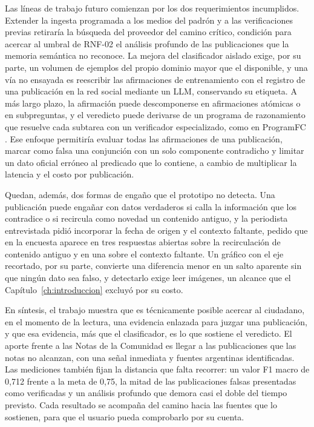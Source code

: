 Las líneas de trabajo futuro comienzan por los dos requerimientos incumplidos. Extender la ingesta programada a los medios del padrón y a las verificaciones previas retiraría la búsqueda del proveedor del camino crítico, condición para acercar al umbral de RNF-02 el análisis profundo de las publicaciones que la memoria semántica no reconoce. La mejora del clasificador aislado exige, por su parte, un volumen de ejemplos del propio dominio mayor que el disponible, y una vía no ensayada es reescribir las afirmaciones de entrenamiento con el registro de una publicación en la red social mediante un LLM, conservando su etiqueta. A más largo plazo, la afirmación puede descomponerse en afirmaciones atómicas o en subpreguntas, y el veredicto puede derivarse de un programa de razonamiento que resuelve cada subtarea con un verificador especializado, como en ProgramFC \parencite{PanEtAl2023}. Ese enfoque permitiría evaluar todas las afirmaciones de una publicación, marcar como falsa una conjunción con un solo componente contradicho y limitar un dato oficial erróneo al predicado que lo contiene, a cambio de multiplicar la latencia y el costo por publicación.

Quedan, además, dos formas de engaño que el prototipo no detecta. Una publicación puede engañar con datos verdaderos si calla la información que los contradice o si recircula como novedad un contenido antiguo, y la periodista entrevistada pidió incorporar la fecha de origen y el contexto faltante, pedido que en la encuesta aparece en tres respuestas abiertas sobre la recirculación de contenido antiguo y en una sobre el contexto faltante. Un gráfico con el eje recortado, por su parte, convierte una diferencia menor en un salto aparente sin que ningún dato sea falso, y detectarlo exige leer imágenes, un alcance que el Capítulo~\ref{ch:introduccion} excluyó por su costo.

En síntesis, el trabajo muestra que es técnicamente posible acercar al ciudadano, en el momento de la lectura, una evidencia enlazada para juzgar una publicación, y que esa evidencia, más que el clasificador, es lo que sostiene el veredicto. El aporte frente a las Notas de la Comunidad es llegar a las publicaciones que las notas no alcanzan, con una señal inmediata y fuentes argentinas identificadas. Las mediciones también fijan la distancia que falta recorrer: un valor F1 macro de 0,712 frente a la meta de 0,75, la mitad de las publicaciones falsas presentadas como verificadas y un análisis profundo que demora casi el doble del tiempo previsto. Cada resultado se acompaña del camino hacia las fuentes que lo sostienen, para que el usuario pueda comprobarlo por su cuenta.

